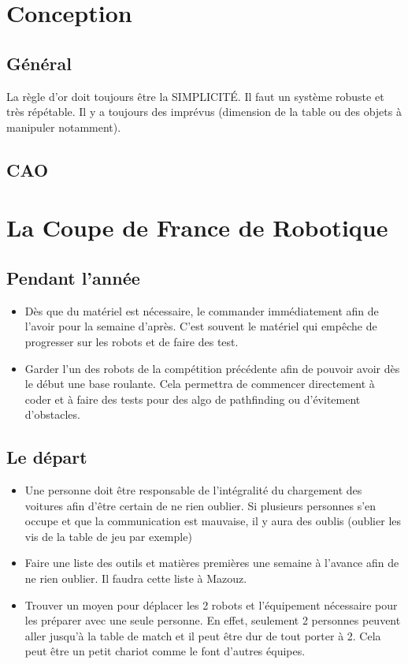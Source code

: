 \documentclass[a4paper, 11pt]{report}
\begin{document}
\part{Conception}

\chapter{Général}

La règle d'or doit toujours être la SIMPLICITÉ. Il faut un système robuste et très répétable. Il y a toujours des imprévus (dimension de la table ou des objets à manipuler notamment).

\chapter{CAO}

\part{La Coupe de France de Robotique}

\chapter{Pendant l'année}
\begin{itemize}
\item Dès que du matériel est nécessaire, le commander immédiatement afin de l’avoir pour la semaine d’après. C’est souvent le matériel qui empêche de progresser sur les robots et de faire des test.
\item Garder l'un des robots de la compétition précédente afin de pouvoir avoir dès le début une base roulante. Cela permettra de commencer directement à coder et à faire des tests pour des algo de pathfinding ou d'évitement d'obstacles.
\end{itemize}
\chapter{Le départ}
\begin{itemize}
\item Une personne doit être responsable de l'intégralité du chargement des voitures afin d'être certain de ne rien oublier. Si plusieurs personnes s'en occupe et que la communication est mauvaise, il y aura des oublis (oublier les vis de la table de jeu par exemple)
\item Faire une liste des outils et matières premières une semaine à l’avance afin de ne rien oublier. Il faudra cette liste à Mazouz.
\item Trouver un moyen pour déplacer les 2 robots et l’équipement nécessaire pour les préparer avec une seule personne. En effet, seulement 2 personnes peuvent aller jusqu’à la table de match et il peut être dur de tout porter à 2. Cela peut être un petit chariot comme le font d’autres équipes.
\end{itemize}
\end{document}
